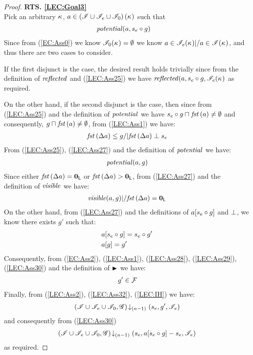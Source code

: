 \begin{lemma}
\begin{proof}
\noindent\textbf{RTS. \ref{LEC:Goal3}}\\
Pick an arbitrary $\kappa_{}$, $a \in \left(\mathscr{I} \cup \mathscr{I}_e \cup \mathscr{I}_0 \right)(\kappa_{})$ such that
%
\begin{align}
	& \mathit{potential}(a, s_e \circ g)  \label{LEC:Ass25}
\end{align}
Since from (\ref{EC:Ass0}) we know $\mathscr{I}_0(\kappa_{}) = \emptyset$ we know $a \in \mathscr{I}_e(\kappa_{}) |/  a \in\mathscr{I}(\kappa_{})$, and thus there are two cases to consider. 

If the first disjunct is the case, the desired result holds trivially since from the definition of $\mathit{reflected}$ and (\ref{LEC:Ass25}) we have $\mathit{reflected}(a, s_e \circ g, \mathscr{I}_e(\kappa_{})$ as required.

On the other hand, if the second disjunct is the case, then since from (\ref{LEC:Ass25}) and the definition of $\mathit{potential}$ we have $s_e \circ g \sqcap_{} \mathit{fst}\left(a\right) \not= \emptyset$ and consequently, $g \sqcap_{} \mathit{fst}\left(a\right) \not= \emptyset$, from (\ref{LEC:Ass1}) we have:
%
\begin{align}
	\mathit{fst}\left(\Delta {a}\right) \leq g /| \mathit{fst}\left(\Delta {a}\right) \mathrel{\bot} s_e \label{LEC:Ass27}
\end{align}
% 
From (\ref{LEC:Ass25}), (\ref{LEC:Ass27}) and the definition of $\mathit{potential}$ we have:
%
\begin{align}
	\mathit{potential}(a, g) \label{LEC:Ass28}
\end{align}
%
Since either $\mathit{fst}\left(\Delta {a}\right) = \mathbf{0}_{\textsf{L}}$ or $\mathit{fst}\left(\Delta {a}\right) > \mathbf{0}_{\textsf{L}}$, from (\ref{LEC:Ass27}) and the definition of $\mathit{visible}$ we have:
%
\begin{align}
	\mathit{visible}(a, g) |/ \mathit{fst}\left(\Delta {a}\right) = \mathbf{0}_{\textsf{L}} \label{LEC:Ass29}
\end{align}
%
On the other hand, from (\ref{LEC:Ass27}) and the definitions of $a[s_e \circ g]$ and $\mathrel{\bot}$, we know there exists $g'$ such that: 
%
\begin{align}
	& a[s_e \circ g] = s_e \circ g' \label{LEC:Ass30}\\
	& a[g] = g'  \label{LEC:Ass31}
\end{align}
%
Consequently, from (\ref{EC:Ass2}), (\ref{LEC:Ass1}), (\ref{LEC:Ass28}), (\ref{LEC:Ass29}), (\ref{LEC:Ass30}) and the definition of $\strictfences$ we have:
%
\begin{align}
	g' \in \mathcal{F}_{}  \label{LEC:Ass32}
\end{align}
%
Finally, from (\ref{LEC:Ass2}), (\ref{LEC:Ass32}), (\ref{LEC:IH}) we have:
%
\begin{align*}
	\left(\mathscr{I} \cup \mathscr{I}_{e} \cup \mathscr{I}_0, \mathscr{G}\right) \!\downarrow_{(n-1)} \left(s_e, g', \mathscr{I}_e\right)
\end{align*}
%
and consequently from (\ref{LEC:Ass30})
%
\begin{align*}
	\left(\mathscr{I} \cup \mathscr{I}_{e} \cup \mathscr{I}_0, \mathscr{G}\right) \!\downarrow_{(n-1)} \left(s_e, a[s_e \circ g] - s_e, \mathscr{I}_e\right)
\end{align*}
%
as required.
\end{proof}
\end{lemma}

